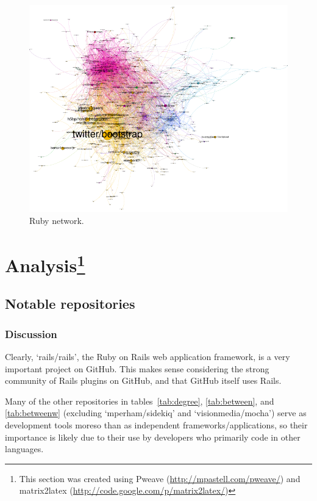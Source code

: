 \documentclass[11pt]{article}
\begin{document}
\begin{figure}[htbp]
    \centering
    \caption{Ruby network.}
    \label{fig:ruby}
\includegraphics[clip=true,trim=1in 2.25in 2.5in 0.5in,scale=2]{repositories-labeled.pdf}
\end{figure}

\section[Analysis]{Analysis\footnote{This section was created using Pweave
(\url{http://mpastell.com/pweave/}) and
matrix2latex (\url{http://code.google.com/p/matrix2latex/})}}

\subsection{Notable repositories}



\subsubsection{Discussion}
Clearly, `rails/rails', the Ruby on Rails web application framework, is a very
important project on GitHub. This makes sense considering the strong community
of Rails plugins on GitHub, and that GitHub itself uses Rails.

Many of the other repositories in tables~\ref{tab:degree}, \ref{tab:between},
and \ref{tab:betweenw} (excluding `mperham/sidekiq' and `visionmedia/mocha')
serve as development tools moreso than as independent frameworks/applications,
so their importance is likely due to their use by developers who primarily code
in other languages.
\end{document}
